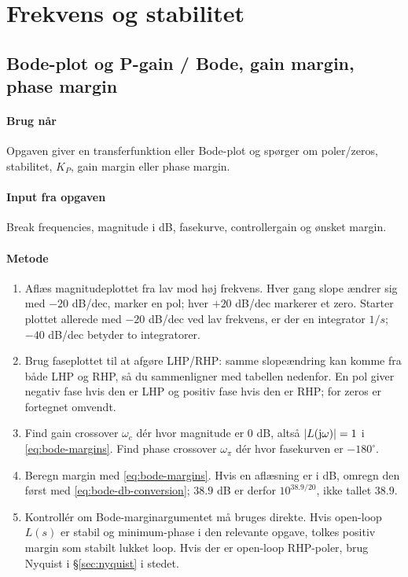 \section{Frekvens og stabilitet}

\subsection{Bode-plot og P-gain / Bode, gain margin, phase margin}
\label{sec:bode}

\paragraph{Brug når}
Opgaven giver en transferfunktion eller Bode-plot og spørger om poler/zeros,
stabilitet, \(K_P\), gain margin eller phase margin.

\paragraph{Input fra opgaven}
Break frequencies, magnitude i dB, fasekurve, controllergain og ønsket margin.

\paragraph{Metode}
\begin{enumerate}
\item Aflæs magnitudeplottet fra lav mod høj frekvens. Hver gang slope ændrer sig
      med \(-20\) dB/dec, marker en pol; hver \(+20\) dB/dec markerer et zero. Starter
      plottet allerede med \(-20\) dB/dec ved lav frekvens, er der en integrator
      \(1/s\); \(-40\) dB/dec betyder to integratorer.
\item Brug faseplottet til at afgøre LHP/RHP: samme slopeændring kan komme fra både
      LHP og RHP, så du sammenligner med tabellen nedenfor. En pol giver negativ
      fase hvis den er LHP og positiv fase hvis den er RHP; for zeros er fortegnet
      omvendt.
\item Find gain crossover \(\omega_c\) dér hvor magnitude er \(0\) dB, altså
      \(|L(\mathrm{j}\omega)|=1\) i \eqref{eq:bode-margins}. Find phase crossover \(\omega_\pi\)
      dér hvor fasekurven er \(-180^\circ\).
\item Beregn margin med \eqref{eq:bode-margins}. Hvis en aflæsning er i dB, omregn den
      først med \eqref{eq:bode-db-conversion}; \(38.9\) dB er derfor
      \(10^{38.9/20}\), ikke tallet \(38.9\).
\item Kontrollér om Bode-marginargumentet må bruges direkte. Hvis open-loop \(L(s)\)
      er stabil og minimum-phase i den relevante opgave, tolkes positiv margin som
      stabilt lukket loop. Hvis der er open-loop RHP-poler, brug Nyquist i
      \S\ref{sec:nyquist} i stedet.
\end{enumerate}

